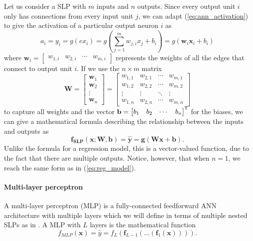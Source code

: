 \documentclass{report}
\renewcommand\vec{\mathbf}
\newcommand*{\tran}{^{\mkern-1.5mu\mathsf{T}}}
\begin{document}
Let us consider a SLP with $m$ inputs and $n$ outputs. 
Since every output unit $i$ only has connections from every input unit $j$,
we can adapt (\ref{eq:ann_activation}) to give the activation of a particular output neuron $i$ as
\begin{equation}
    a_i = y_i = g\left({ex}_i\right) = g\left(\sum_{j=1}^m{w_{j,i} x_j} + b_i\right)
    = g\left( \vec{w}_i \vec{x}_i + b_i\right)
\end{equation}
where
$
    \vec{w}_i = \begin{bmatrix}
        w_{1,i} & w_{2,i} & \cdots & w_{m,i}
    \end{bmatrix}
$
represents the weights of all the edges that connect to output unit $i$.
If we use the $n \times m$ matrix
\begin{equation}
    \vec{W} = \begin{bmatrix}
        \vec{w}_1 \\ \vec{w}_2 \\ \vdots \\ \vec{w}_n
    \end{bmatrix} = \begin{bmatrix}
        w_{1,1} & w_{2,1} & \cdots & w_{m,1} \\
        w_{1,2} & w_{2,2} & \cdots & w_{m,2} \\
        \vdots & \vdots & \ddots & \vdots \\
        w_{1,n} & w_{2,n} & \cdots & w_{m,n}
    \end{bmatrix}
\end{equation}
to capture all weights and the vector $\vec{b} = \begin{bmatrix}
    b_1 & b_2 & \cdots & b_n
\end{bmatrix}\tran$ for the biases, we can give a mathematical formula describing the relationship between the inputs and outputs as
\begin{equation}
    \label{eq:single_layer_perceptron}
    \vec{f_{SLP}}(\vec{x}; \vec{W}, \vec{b}) = \vec{\hat{y}} = \vec{g}\left( \vec{W} \vec{x} + \vec{b} \right).
\end{equation}
Unlike the formula for a regression model, this is a vector-valued function, due to the fact that there are multiple outputs. 
Notice, however, that when $n=1$, we reach the same form as in (\ref{eq:reg_model}). 

\paragraph{Multi-layer perceptron}
A multi-layer perceptron (MLP) is a fully-connected feedforward ANN architecture with multiple layers which we will define in terms of multiple nested SLPs as in \cite{burkov2019}.
A MLP with $L$ layers is the mathematical function
\begin{equation}
    f_{MLP}(\vec{x})
        = \hat{y}
        = f_L \left(
            \vec{f}_{L-1} \left(
                \vec{\dots} \left(
                    \vec{f}_1 \left(
                        \vec{x}
                    \right)
                \right)
            \right)
        \right).
\end{equation}
\end{document}
